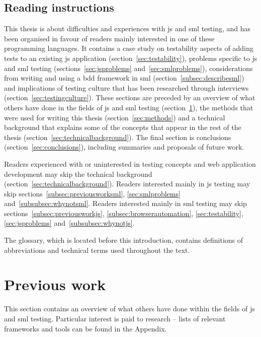 \documentclass[11pt]{article}
\begin{document}
\subsection{Reading instructions}

This thesis is about difficulties and experiences with \gls{js} and \gls{sml} testing, and has been organised in favour of readers mainly interested in one of these programming languages. It contains a case study on testability aspects of adding tests to an existing \gls{js} application (section~\ref{sec:testability}), problems specific to \gls{js} and \gls{sml} testing (sections~\ref{sec:jsproblems} and~\ref{sec:smlproblems}), considerations from writing and using a \gls{bdd} framework in \gls{sml} (section~\ref{subsec:describesml}) and implications of testing culture that has been researched through interviews (section~\ref{sec:testingculture}). These sections are preceded by an overview of what others have done in the fields of \gls{js} and \gls{sml} testing (section~\ref{sec:previouswork}), the methods that were used for writing this thesis (section~\ref{sec:methods}) and a technical background that explains some of the concepts that appear in the rest of the thesis (section~\ref{sec:technicalbackground}). The final section is conclusions (section~\ref{sec:conclusions}), including summaries and proposals of future work.

Readers experienced with or uninterested in testing concepts and web application development may skip the technical background (section~\ref{sec:technicalbackground}). Readers interested mainly in \gls{js} testing may skip sections~\ref{subsec:previousworksml}, \ref{sec:smlproblems} and~\ref{subsubsec:whynotsml}. Readers interested mainly in \gls{sml} testing may skip sections~\ref{subsec:previousworkjs}, \ref{subsec:browserautomation}, \ref{sec:testability}, \ref{sec:jsproblems} and~\ref{subsubsec:whynotjs}.

The glossary, which is located before this introduction, contains definitions of abbreviations and technical terms used throughout the text.

\section{Previous work}
\label{sec:previouswork}

This section contains an overview of what others have done within the fields of \gls{js} and \gls{sml} testing. Particular interest is paid to research -- lists of relevant frameworks and tools can be found in the Appendix.
\end{document}
